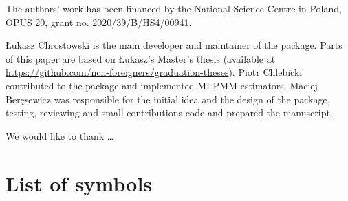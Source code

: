 \documentclass[
]{jss}
\begin{document}
The authors' work has been financed by the National Science Centre in
Poland, OPUS 20, grant no. 2020/39/B/HS4/00941.

Łukasz Chrostowski is the main developer and maintainer of the package.
Parts of this paper are based on Łukasz's Master's thesis (available at
\url{https://github.com/ncn-foreigners/graduation-theses}). Piotr
Chlebicki contributed to the package and implemented MI-PMM estimators.
Maciej Beręsewicz was responsible for the initial idea and the design of
the package, testing, reviewing and small contributions code and
prepared the manuscript.

We would like to thank \ldots{}

\clearpage

\appendix

\section{List of symbols}\label{list-of-symbols}
\end{document}
